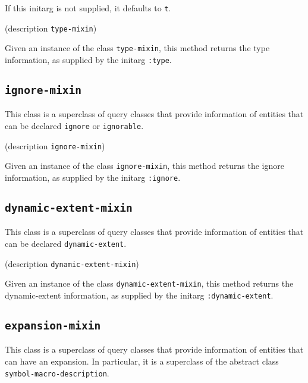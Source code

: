 
If this initarg is not supplied, it defaults to \texttt{t}.

 {(description {\tt type-mixin})}

Given an instance of the class \texttt{type-mixin}, this method
returns the type information, as supplied by the initarg
\texttt{:type}.

\subsection{\texttt{ignore-mixin}}
\label{sec-ignore-mixin}


This class is a superclass of query classes that provide information
of entities that can be declared \texttt{ignore} or \texttt{ignorable}.


 {(description {\tt ignore-mixin})}

Given an instance of the class \texttt{ignore-mixin}, this method
returns the ignore information, as supplied by the initarg
\texttt{:ignore}.

\subsection{\texttt{dynamic-extent-mixin}}
\label{sec-dynamic-extent-mixin}


This class is a superclass of query classes that provide information
of entities that can be declared \texttt{dynamic-extent}.


 {(description {\tt dynamic-extent-mixin})}

Given an instance of the class \texttt{dynamic-extent-mixin}, this method
returns the dynamic-extent information, as supplied by the initarg
\texttt{:dynamic-extent}.

\subsection{\texttt{expansion-mixin}}
\label{sec-expansion-mixin}

This class is a superclass of query classes that provide information
of entities that can have an expansion.  In particular, it is a
superclass of the abstract class \texttt{symbol-macro-description}.

